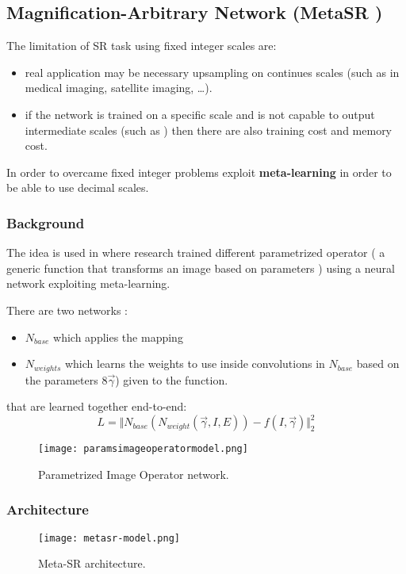 \subsection{Magnification-Arbitrary Network (MetaSR \cite{MetaSR})}\label{metasr}
The limitation of SR task using fixed integer scales are:
\begin{itemize}
    \item real application may be necessary upsampling on continues scales (such as in medical imaging, satellite imaging, \dots ).
    \item if the network is trained on a specific scale and is not capable to output intermediate scales (such as \cite{LapSRN}) then there are also training cost and memory cost.
\end{itemize}

In order to overcame fixed integer problems \cite{MetaSR} exploit \textbf{meta-learning} in order to be able to use decimal scales.

\subsubsection{Background}

The idea is used in \cite{ParametrizedImageOperator} where research trained different parametrized operator ( a generic function that transforms an image based on parameters ) using a neural network exploiting meta-learning.

There are two networks :
\begin{itemize}
    \item $N_{base}$ which applies the mapping
    \item $N_{weights}$ which learns the weights to use inside convolutions in $N_{base}$ based on the parameters 8$\vec{\gamma}$) given to the function. 
\end{itemize}
that are learned together end-to-end: 
$$
L = \Vert N_{base}(N_{weight}(\vec{\gamma},I,E)) - f(I,\vec{\gamma}) \Vert_2^2
$$
\begin{figure}
    \centering
    \texttt{[image: paramsimageoperatormodel.png]}
    \caption{Parametrized Image Operator network.}\label{PIO:model}
\end{figure}

\subsubsection{Architecture}
\begin{figure}
    \centering
    \texttt{[image: metasr-model.png]}
    \caption{Meta-SR architecture.}\label{metasr:model}
\end{figure}

